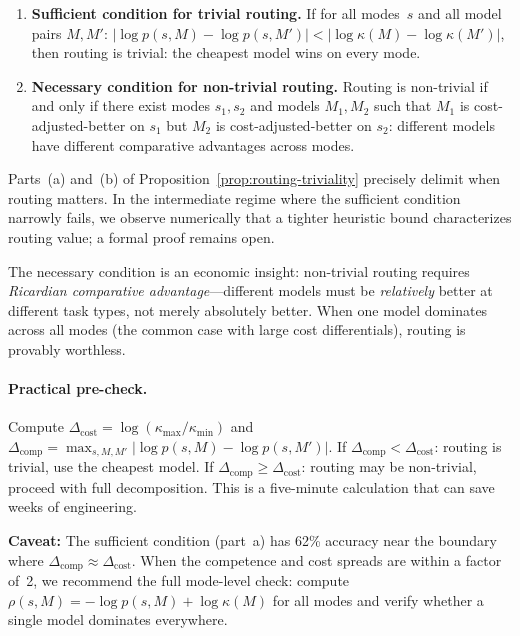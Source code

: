 \begin{proposition}
\label{prop:routing-triviality}
\begin{enumerate}[label=(\alph*)]
  \item \textbf{Sufficient condition for trivial routing.}
  If for all modes~$s$ and all model pairs $M, M'$:
  $|\log p(s, M) - \log p(s, M')| < |\log \kappa(M) - \log \kappa(M')|$,
  then routing is trivial: the cheapest model wins on every mode.
  \item \textbf{Necessary condition for non-trivial routing.}
  Routing is non-trivial if and only if there exist modes $s_1, s_2$ and models $M_1, M_2$ such that $M_1$ is cost-adjusted-better on $s_1$ but $M_2$ is cost-adjusted-better on $s_2$: different models have different comparative advantages across modes.
\end{enumerate}
\end{proposition}

\begin{remark}
\label{rem:intermediate-routing}
Parts~(a) and~(b) of Proposition~\ref{prop:routing-triviality} precisely delimit when routing matters.
In the intermediate regime where the sufficient condition narrowly fails, we observe numerically that a tighter heuristic bound characterizes routing value; a formal proof remains open.
\end{remark}

The necessary condition is an economic insight: non-trivial routing requires \emph{Ricardian comparative advantage}---different models must be \emph{relatively} better at different task types, not merely absolutely better.
When one model dominates across all modes (the common case with large cost differentials), routing is provably worthless.

\paragraph{Practical pre-check.}
Compute $\Delta_{\mathrm{cost}} = \log(\kappa_{\max}/\kappa_{\min})$ and $\Delta_{\mathrm{comp}} = \max_{s,M,M'} |\log p(s,M) - \log p(s,M')|$.
If $\Delta_{\mathrm{comp}} < \Delta_{\mathrm{cost}}$: routing is trivial, use the cheapest model.
If $\Delta_{\mathrm{comp}} \ge \Delta_{\mathrm{cost}}$: routing may be non-trivial, proceed with full decomposition.
This is a five-minute calculation that can save weeks of engineering.

\textbf{Caveat:} The sufficient condition (part~a) has 62\% accuracy near the boundary where $\Delta_{\mathrm{comp}} \approx \Delta_{\mathrm{cost}}$.
When the competence and cost spreads are within a factor of~2, we recommend the full mode-level check: compute $\rho(s,M) = -\log p(s,M) + \log\kappa(M)$ for all modes and verify whether a single model dominates everywhere.

